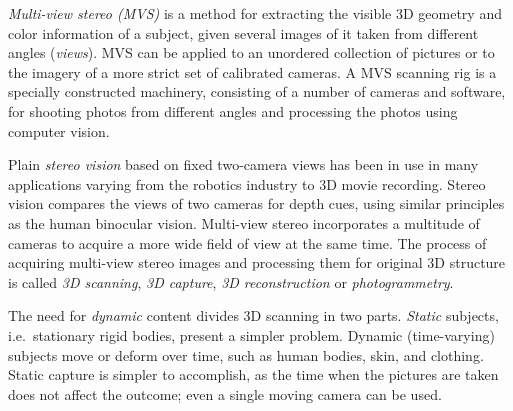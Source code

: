 

\emph{Multi-view stereo (MVS)} is a method for extracting the visible 3D geometry and color information of a subject, given several images of it taken from different angles (\emph{views}).
MVS can be applied to an unordered collection of pictures or to the imagery of a more strict set of calibrated cameras.
A MVS scanning rig is a specially constructed machinery, consisting of a number of cameras and software, for shooting photos from different angles and processing the photos using computer vision.


Plain \emph{stereo vision} based on fixed two-camera views has been in use in many applications varying from the robotics industry to 3D movie recording.
Stereo vision compares the views of two cameras for depth cues, using similar principles as the human binocular vision.
Multi-view stereo incorporates a multitude of cameras to acquire a more wide field of view at the same time.
The process of acquiring multi-view stereo images and processing them for original 3D structure is called \emph{3D scanning}, \emph{3D capture}, \emph{3D reconstruction} or \emph{photogrammetry}.


The need for \emph{dynamic} content divides 3D scanning in two parts.
\emph{Static} subjects, i.e.\ stationary rigid bodies, present a simpler problem.
Dynamic (time-varying) subjects move or deform over time, such as human bodies, skin, and clothing.
Static capture is simpler to accomplish, as the time when the pictures are taken does not affect the outcome; even a single moving camera can be used.



